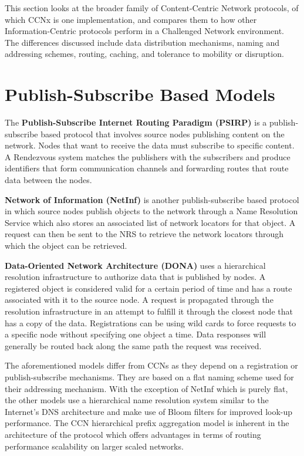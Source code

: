 \documentclass[a4paper,12pt]{report}      %
\begin{document}
This section looks at the broader family of Content-Centric Network protocols, of which CCNx is one
implementation, and compares them to how other Information-Centric protocols perform in a
Challenged Network environment. The differences discussed include data distribution mechanisms,
naming and addressing schemes, routing, caching, and tolerance to mobility or disruption\cite{dirk2941}.

\section{Publish-Subscribe Based Models}

The \textbf{Publish-Subscribe Internet Routing Paradigm (PSIRP)} is a publish-subscribe based protocol
that involves source nodes publishing content on the network. Nodes that want to receive the data must
subscribe to specific content. A Rendezvous system matches the publishers with the subscribers and
produce identifiers that form communication channels and forwarding routes that route data between
the nodes.

\textbf{Network of Information (NetInf)} is another publish-subscribe based protocol in which source nodes
publish objects to the network through a Name Resolution Service which also stores an associated list
of network locators for that object. A request can then be sent to the NRS to retrieve the network
locators through which the object can be retrieved.

\textbf{Data-Oriented Network Architecture (DONA)} uses a hierarchical resolution infrastructure to
authorize data that is published by nodes. A registered object is considered valid for a certain period of
time and has a route associated with it to the source node. A request is propagated through the
resolution infrastructure in an attempt to fulfill it through the closest node that has a copy of the data.
Registrations can be using wild cards to force requests to a specific node without specifying one object
a time. Data responses will generally be routed back along the same path the request was received.

The aforementioned models differ from CCNs as they depend on a registration or publish-subscribe
mechanisms. They are based on a flat naming scheme used for their addressing mechanism. With the
exception of NetInf which is purely flat, the other models use a hierarchical name resolution system
similar to the Internet's DNS architecture and make use of Bloom filters for improved look-up
performance. The CCN hierarchical prefix aggregation model is inherent in the architecture of the
protocol which offers advantages in terms of routing performance scalability on larger scaled networks.
\end{document}
